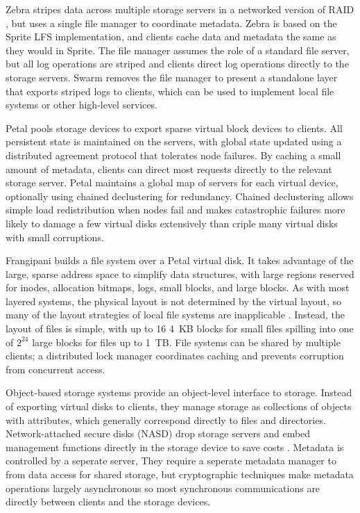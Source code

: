 Zebra \cite{hartman93} stripes data across multiple storage servers in a networked version of RAID \cite{patterson}, but uses a single file manager to coordinate metadata. Zebra is based on the Sprite LFS implementation, and clients cache data and metadata the same as they would in Sprite. The file manager assumes the role of a standard file server, but all log operations are striped and clients direct log operations directly to the storage servers. Swarm \cite{hartman99} removes the file manager to present a standalone layer that exports striped logs to clients, which can be used to implement local file systems or other high-level services.

Petal \cite{lee95,lee96} pools storage devices to export sparse virtual block devices to clients. All persistent state is maintained on the servers, with global state updated using a distributed agreement protocol that tolerates node failures. By caching a small amount of metadata, clients can direct most requests directly to the relevant storage server. Petal maintains a global map of servers for each virtual device, optionally using chained declustering for redundancy. Chained declustering \cite{hsiao} allows simple load redistribution when nodes fail and makes catastrophic failures more likely to damage a few virtual disks extensively than criple many virtual disks with small corruptions.

Frangipani \cite{thekkath} builds a file system over a Petal virtual disk. It takes advantage of the large, sparse address space to simplify data structures, with large regions reserved for inodes, allocation bitmaps, logs, small blocks, and large blocks. As with most layered systems, the physical layout is not determined by the virtual layout, so many of the layout strategies of local file systems are inapplicable \cite{stein05}. Instead, the layout of files is simple, with up to 16 4~KB blocks for small files spilling into one of $2^24$ large blocks for files up to 1~TB. File systems can be shared by multiple clients; a distributed lock manager coordinates caching and prevents corruption from concurrent access.

Object-based storage systems \cite{mesnier} provide an object-level interface to storage. Instead of exporting virtual disks to clients, they manage storage as collections of objects with attributes, which generally correspond directly to files and directories. Network-attached secure disks (NASD) drop storage servers and embed management functions directly in the storage device to save costs \cite{gibson97,gibson98a}. Metadata is controlled by a seperate server, They require a seperate metadata manager to from data access for shared storage, but cryptographic techniques make metadata operations largely asynchronous so most synchronous communications are directly between clients and the storage devices. 

